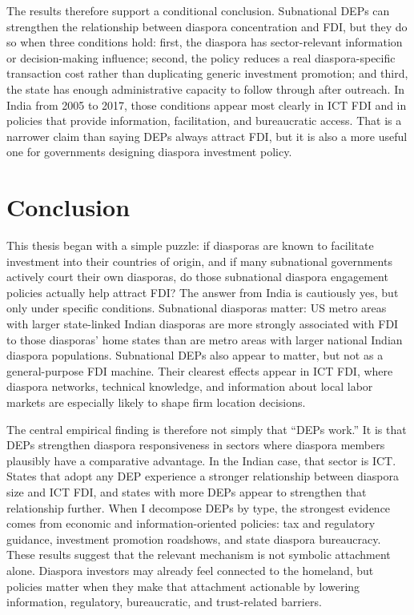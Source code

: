 \documentclass[doublespace,nopageskip]{UVAthesis}
\begin{document}
The results therefore support a conditional conclusion. Subnational DEPs can strengthen the relationship between diaspora concentration and FDI, but they do so when three conditions hold: first, the diaspora has sector-relevant information or decision-making influence; second, the policy reduces a real diaspora-specific transaction cost rather than duplicating generic investment promotion; and third, the state has enough administrative capacity to follow through after outreach. In India from 2005 to 2017, those conditions appear most clearly in ICT FDI and in policies that provide information, facilitation, and bureaucratic access. That is a narrower claim than saying DEPs always attract FDI, but it is also a more useful one for governments designing diaspora investment policy.
    
\chapter{Conclusion} \label{ch:conclusion}

This thesis began with a simple puzzle: if diasporas are known to facilitate investment into their countries of origin, and if many subnational governments actively court their own diasporas, do those subnational diaspora engagement policies actually help attract FDI? The answer from India is cautiously yes, but only under specific conditions. Subnational diasporas matter: US metro areas with larger state-linked Indian diasporas are more strongly associated with FDI to those diasporas' home states than are metro areas with larger national Indian diaspora populations. Subnational DEPs also appear to matter, but not as a general-purpose FDI machine. Their clearest effects appear in ICT FDI, where diaspora networks, technical knowledge, and information about local labor markets are especially likely to shape firm location decisions.

The central empirical finding is therefore not simply that ``DEPs work.'' It is that DEPs strengthen diaspora responsiveness in sectors where diaspora members plausibly have a comparative advantage. In the Indian case, that sector is ICT. States that adopt any DEP experience a stronger relationship between diaspora size and ICT FDI, and states with more DEPs appear to strengthen that relationship further. When I decompose DEPs by type, the strongest evidence comes from economic and information-oriented policies: tax and regulatory guidance, investment promotion roadshows, and state diaspora bureaucracy. These results suggest that the relevant mechanism is not symbolic attachment alone. Diaspora investors may already feel connected to the homeland, but policies matter when they make that attachment actionable by lowering information, regulatory, bureaucratic, and trust-related barriers.
\end{document}
